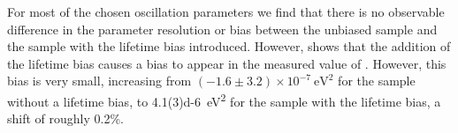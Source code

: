 For most of the chosen oscillation parameters we find that there is no observable difference in the parameter resolution or bias between the unbiased sample and the sample with the lifetime bias introduced.
However,  shows that the addition of the lifetime bias causes a bias to appear in the measured value of . 
However, this bias is very small, increasing from $(-1.6 \pm 3.2) \times 10^{-7}~\si{\eV\squared}$ for the sample without a lifetime bias, to \SI{4.1(3)d-6}{\eV\squared} for the sample with the lifetime bias, a shift of roughly 0.2\%.

